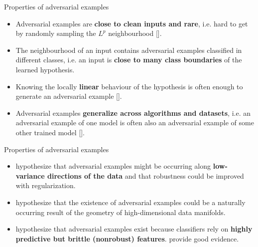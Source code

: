 \documentclass{beamer}
\newcommand{\citet}[1]{{\color{citecolor}\relscale{0.8}\textcite{#1}}}
\newcommand{\citep}[1]{{\color{citecolor}\relscale{0.8}[\textcite{#1}]}}
\begin{document}
\begin{frame}[allowframebreaks=0.9]{Properties of adversarial examples}
\begin{itemize}
	\item Adversarial examples are \textbf{close to clean inputs and rare}, i.e. hard to get by randomly sampling the $L^p$ neighbourhood \citep{Szegedy:2013:IPNN}.    
	\item The neighbourhood of an input contains adversarial examples classified in different classes, i.e. an input is \textbf{close to many class boundaries} of the learned hypothesis.
    \item Knowing the locally \textbf{linear} behaviour of the hypothesis is often enough to generate an adversarial example \citep{Goodfellow:2014:EHAE}.
    \item Adversarial examples \textbf{generalize across algorithms and datasets}, i.e. an adversarial example of one model is often also an adversarial example of some other trained model \citep{Szegedy:2013:IPNN,Papernot:2016:TMLPBBAAS,Liu:2016:DTAEBBA,Tramer:2017:STAE}.
\end{itemize}
\end{frame}

\begin{frame}[allowframebreaks=0.9]{Properties of adversarial examples}
\begin{itemize}
    \item \citet{Tanay:2016:ABTPPAE} hypothesize that adversarial examples might be occurring along \textbf{low-variance directions of the data} and that robustness could be improved with regularization.
    \item \citet{Gilmer:2018:AS} hypothesize that the existence of adversarial examples could be a naturally occurring result of the geometry of high-dimensional data manifolds.
    \item \citet{Tsipras:2018:RMBOA,Ilyas:2019:AENBTF} hypothesize that adversarial examples exist because classifiers rely on \textbf{highly predictive but brittle (nonrobust) features}. \citet{Ilyas:2019:AENBTF} provide good evidence.
\end{itemize}
\end{frame}
\end{document}
